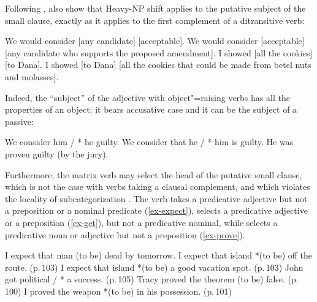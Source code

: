 \ealnoraggedright
{}
\label{w}
\zl

Following \citet[420--423]{Bresnan1982},
\citet[113]{PollardandSag1994} also show that Heavy-NP shift
applies to the putative subject of the small clause, exactly as it applies to the first complement
of a ditransitive verb:

\eal
\ex We would consider [any candidate] [acceptable].
\ex We would consider [acceptable]  [any candidate who supports the proposed amendment].
\ex I showed [all the cookies] [to Dana].
\ex I showed [to Dana]  [all the cookies that could be made from betel nuts and molasses].  
\zl

Indeed, the ``subject'' of the adjective with object"=raising verbs has all the properties of an
object: it bears accusative case and it can be the subject of a passive:

\eal
\ex We consider him / * he guilty.
\ex We consider that he / * him is guilty.
\ex He was proven guilty (by the jury).	
\zl
	

Furthermore, the matrix verb may select the head of the putative small clause, which is not the case
with verbs taking a clausal complement, and which violates the 
locality of subcategorization \parencites[]{PollardandSag1994}{Sag2007a}. The
verb  takes a predicative adjective but not a preposition or a nominal predicate (\ref{ex-expect}),
 selects a predicative adjective or a preposition (\ref{ex-get}), but not a predicative nominal, while
 selects a predicative noun or adjective but not a preposition (\ref{ex-prove}).


\eal
\label{ex-expect}
\ex I expect that man (to be) dead  by tomorrow. \citep[]{PollardandSag1994}
\ex I expect that island *(to be) off the route. (p.\,103)
\ex I expect that island *(to be) a good vacation spot. (p.\,103)
\zl
\ea
\label{ex-get}
John got political / * a success. (p.\,105)	
\z
\eal
\label{ex-prove}
\ex Tracy proved the theorem (to be) false. (p.\,100)
\ex I proved the weapon *(to be) in his possession.	(p.\,101)
\zl
	


